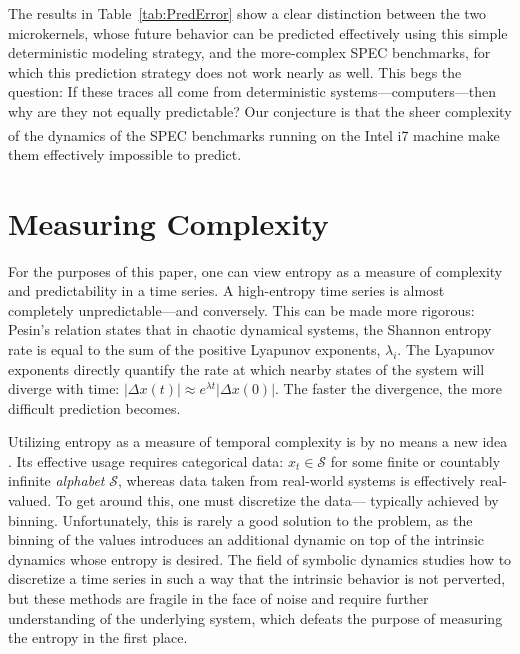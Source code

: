 \documentclass{article}
\begin{document}
The results in Table~\ref{tab:PredError} show a clear distinction
between the two microkernels, whose future behavior can be
predicted effectively using this simple deterministic modeling
strategy, and the more-complex SPEC benchmarks, for which this
prediction strategy does not work nearly as well.
%
This begs the question: If these traces all come from deterministic
systems---computers---then why are they not equally predictable?  Our
conjecture is that the sheer complexity of the dynamics of the SPEC
benchmarks running on the Intel i7\textsuperscript{\textregistered}
machine make them effectively impossible to predict.


\section{Measuring Complexity}\label{sec:meaComplex}

For the purposes of this paper, one can view entropy as a measure of complexity
and predictability in a time series.  A high-entropy time series is almost
completely unpredictable---and conversely.  This can be made more rigorous:
Pesin's relation \cite{pesin77} states that in chaotic dynamical systems, the
Shannon entropy rate is equal to the sum of the positive Lyapunov exponents,
$\lambda_i$. The Lyapunov exponents directly quantify the rate at which nearby
states of the system will diverge with time: $\left| \Delta x(t) \right| \approx
e^{\lambda t} \left| \Delta x(0) \right|$.  The faster the divergence, the more
difficult prediction becomes.

Utilizing entropy as a measure of temporal complexity is by no means a new idea
\cite{Shannon1951, mantegna1994linguistic}.  Its effective usage requires
categorical data: $x_t \in \mathcal{S}$ for some finite or countably infinite
\emph{alphabet} $\mathcal{S}$, whereas data taken from real-world systems is
effectively real-valued.  To get around this, one must discretize the data---
typically achieved by binning.  Unfortunately, this is rarely a good solution to
the problem, as the binning of the values introduces an additional dynamic on
top of the intrinsic dynamics whose entropy is desired.  The field of symbolic
dynamics studies how to discretize a time series in such a way that the
intrinsic behavior is not perverted, but these methods are fragile in the face
of noise and require further understanding of the underlying system, which
defeats the purpose of measuring the entropy in the first place.
\end{document}
